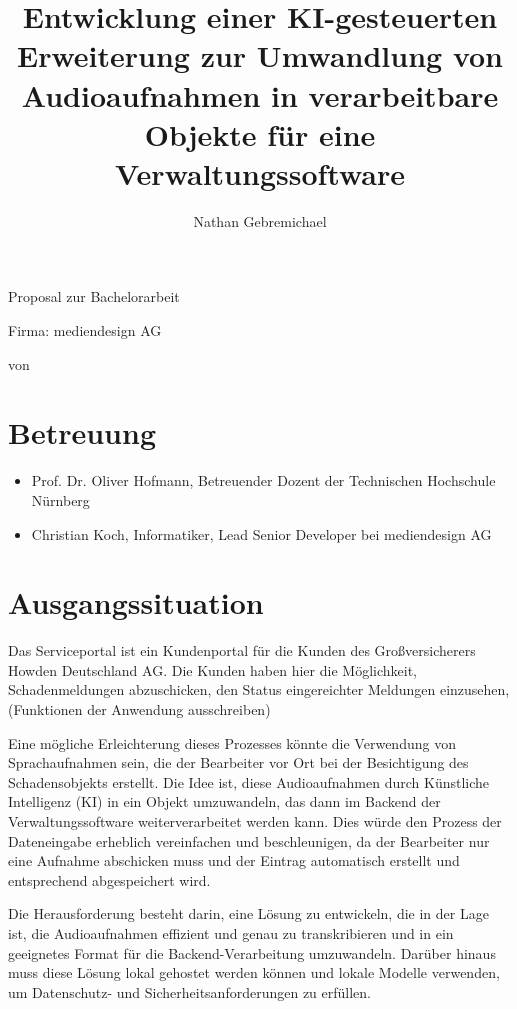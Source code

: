 \documentclass[12pt,a4paper,parskip=full]{scrartcl}
\title{Entwicklung einer KI-gesteuerten Erweiterung zur Umwandlung von Audioaufnahmen in verarbeitbare Objekte für eine Verwaltungssoftware}
\author{Nathan Gebremichael}
\date{}
\newcommand{\firma}{mediendesign AG}
\begin{document}
\makeatletter

{
    \centering
    {\Large Proposal zur Bachelorarbeit \par}
    \vspace*{1cm}
    {\LARGE \@title \par}
    \vspace*{1cm}
    {\large Firma: \firma \par}
    \vspace*{0.5cm}
    {\small von \@author \par}
    }

\section*{Betreuung}
\begin{itemize}
    \item Prof. Dr. Oliver Hofmann, Betreuender Dozent der Technischen Hochschule Nürnberg
    \item Christian Koch, Informatiker, Lead Senior Developer bei mediendesign AG
\end{itemize}

\section*{Ausgangssituation}
Das Serviceportal ist ein Kundenportal für die Kunden des Großversicherers Howden Deutschland AG.
Die Kunden haben hier die Möglichkeit, Schadenmeldungen abzuschicken, den Status eingereichter Meldungen einzusehen, (Funktionen der Anwendung ausschreiben)




Eine mögliche Erleichterung dieses Prozesses könnte die Verwendung von Sprachaufnahmen sein, die der Bearbeiter vor Ort bei der Besichtigung des Schadensobjekts erstellt.
Die Idee ist, diese Audioaufnahmen durch Künstliche Intelligenz (KI) in ein Objekt umzuwandeln, das dann im Backend der Verwaltungssoftware weiterverarbeitet werden kann.
Dies würde den Prozess der Dateneingabe erheblich vereinfachen und beschleunigen, da der Bearbeiter nur eine Aufnahme abschicken muss und der Eintrag automatisch erstellt und entsprechend abgespeichert wird.

Die Herausforderung besteht darin, eine Lösung zu entwickeln, die in der Lage ist, die Audioaufnahmen effizient und genau zu transkribieren und in ein geeignetes Format für die Backend-Verarbeitung umzuwandeln.
Darüber hinaus muss diese Lösung lokal gehostet werden können und lokale Modelle verwenden, um Datenschutz- und Sicherheitsanforderungen zu erfüllen.
\end{document}
